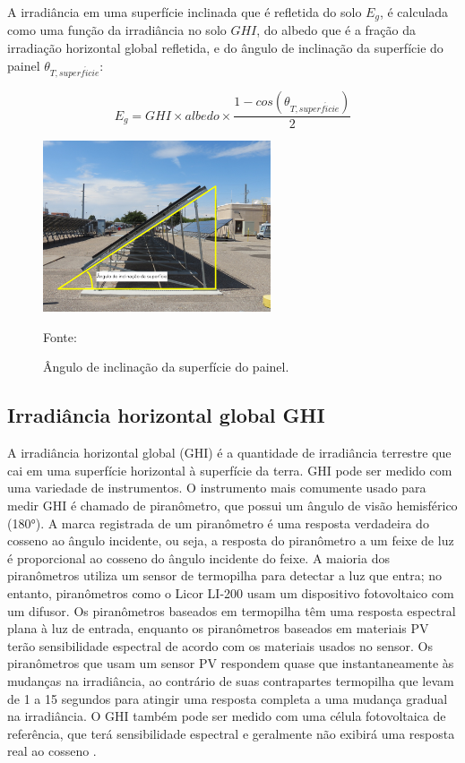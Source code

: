 A irradiância em uma superfície inclinada que é refletida do solo $E_g$, é calculada como uma função da irradiância no solo $GHI$, do albedo que é a fração da irradiação horizontal global refletida, e do ângulo de inclinação da superfície do painel $\theta_{T, superf\acute{i}cie}$:

\begin{equation}
    E_g = GHI \times albedo \times \frac{1 - cos(\theta_{T, superf\acute{i}cie})}{2}
    \label{eq:eg}
\end{equation}

\begin{figure}[H]
    \centering
    \includegraphics[width=0.6\textwidth]{./Figuras/angulo_superficie.png}
    \caption{Ângulo de inclinação da superfície do painel.}{Fonte: \cite{sandia}}
   \label{fig:angulo_superficie}
\end{figure}

\subsection{Irradiância horizontal global GHI}

A irradiância horizontal global (GHI) é a quantidade de irradiância terrestre que cai em uma superfície horizontal à superfície da terra. GHI pode ser medido com uma variedade de instrumentos. O instrumento mais comumente usado para medir GHI é chamado de piranômetro, que possui um ângulo de visão hemisférico (180°). A marca registrada de um piranômetro é uma resposta verdadeira do cosseno ao ângulo incidente, ou seja, a resposta do piranômetro a um feixe de luz é proporcional ao cosseno do ângulo incidente do feixe. A maioria dos piranômetros utiliza um sensor de termopilha para detectar a luz que entra; no entanto, piranômetros como o Licor LI-200 usam um dispositivo fotovoltaico com um difusor. Os piranômetros baseados em termopilha têm uma resposta espectral plana à luz de entrada, enquanto os piranômetros baseados em materiais PV terão sensibilidade espectral de acordo com os materiais usados no sensor. Os piranômetros que usam um sensor PV respondem quase que instantaneamente às mudanças na irradiância, ao contrário de suas contrapartes termopilha que levam de 1 a 15 segundos para atingir uma resposta completa a uma mudança gradual na irradiância. O GHI também pode ser medido com uma célula fotovoltaica de referência, que terá sensibilidade espectral e geralmente não exibirá uma resposta real ao cosseno \cite{sandia}.

